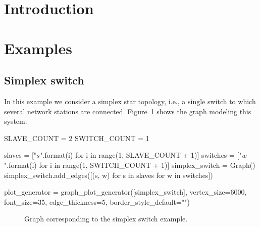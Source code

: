 \documentclass[times,a4paper,10pt,twocolumn]{article}
\theoremstyle{definition}
\theoremstyle{definition}
\theoremstyle{plain}
\begin{document}
\begin{abstract}

\end{abstract}







\section{Introduction}

\section{Examples}
\label{sec:Examples}


\subsection{Simplex switch}

In this example we consider a simplex star topology, i.e., a single switch to
which several network stations are connected. Figure~\ref{fig:simplex-switch}
shows the graph modeling this system.


\begin{sagesilent}

SLAVE_COUNT = 2
SWITCH_COUNT = 1

slaves = ["$s_{}$".format(i) for i in range(1, SLAVE_COUNT + 1)]
switches = ["$w_{}$".format(i) for i in range(1, SWITCH_COUNT + 1)]
simplex_switch = Graph()
simplex_switch.add_edges([(s, w) for s in slaves for w in switches])

plot_generator = graph_plot_generator([simplex_switch], vertex_size=6000,
    font_size=35, edge_thickness=5, border_style_default="")
\end{sagesilent}

\begin{figure}
\centering
{}
\caption{Graph corresponding to the simplex switch example.}
\label{fig:simplex-switch}
\end{figure}
\end{document}
